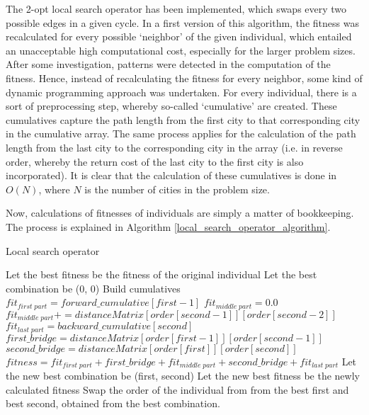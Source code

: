 \documentclass[a4paper,10pt]{article}
\begin{document}
The 2-opt local search operator has been implemented, which swaps every two possible edges in a given cycle. In a first version of this algorithm, the fitness was recalculated for every possible `neighbor' of the given individual, which entailed an unacceptable high computational cost, especially for the larger problem sizes. After some investigation, patterns were detected in the computation of the fitness. Hence, instead of recalculating the fitness for every neighbor, some kind of dynamic programming approach was undertaken. For every individual, there is a sort of preprocessing step, whereby so-called `cumulative' are created. These cumulatives capture the path length from the first city to that corresponding city in the cumulative array. The same process applies for the calculation of the path length from the last city to the corresponding city in the array (i.e. in reverse order, whereby the return cost of the last city to the first city is also incorporated). It is clear that the calculation of these cumulatives is done in $O(N)$, where $N$ is the number of cities in the problem size.

Now, calculations of fitnesses of individuals are simply a matter of bookkeeping. The process is explained in Algorithm \ref{local_search_operator_algorithm}.


\begin{algorithm}
\caption{Local search operator}\label{local_search_operator_algorithm}
\begin{algorithmic}
\State Let the best fitness be the fitness of the original individual
\State Let the best combination be (0, 0)
\State Build cumulatives
\State $fit_{first \; part} = forward\_cumulative[first - 1]$
\State $fit_{middle \; part} = 0.0$
\State $fit_{middle \; part} \mathrel{{+}{=}} distanceMatrix[order[second-1]][order[second-2]]$
\State $fit_{last \; part} = backward\_cumulative[second]$
\State $first\_bridge = distanceMatrix[order[first-1]][order[second-1]]$
\State $second\_bridge = distanceMatrix[order[first]][order[second]]$
\State $fitness = fit_{first \; part} + first\_bridge + fit_{middle \; part} + second\_bridge + fit_{last \; part}$
\State Let the new best combination be (first, second)
\State Let the new best fitness be the newly calculated fitness
\EndIf
\EndFor
\EndFor
\State Swap the order of the individual from from the best first and best second, obtained from the best combination.
\end{algorithmic}
\end{algorithm}
\end{document}
